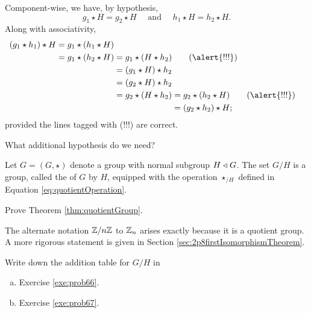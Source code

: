\documentclass[../algebraNotesMSRI-UP2016.tex]{subfiles}
\begin{document}
\begin{frame}
Component-wise, we have, by hypothesis, 
\[
g_1\star H=g_2\star H\quad\text{ and }\quad h_1\star H=h_2\star H.
\]
Along with associativity,
\begin{align*}
(g_1\star h_1)\star H = g_1\star(h_1\star H) \\
	= g_1\star(h_2\star H) &= g_1\star(H\star h_2) \tag{\alert{!!!}}\\
	&= (g_1\star H)\star h_2 \\
	&= (g_2\star H)\star h_2 \\
	&= g_2\star (H\star h_2) = g_2\star (h_2\star H) \tag{\alert{!!!}}\\
	&\phantom{= g_2\star (H\star h_2)} \;=(g_2\star h_2)\star H;
\end{align*}
provided the lines tagged with (\alert{!!!}) are correct.

\smallGap
\begin{que}
What additional hypothesis do we need?
\end{que}
\end{frame}

\begin{frame}[c]
\begin{thm}\label{thm:quotientGroup}
Let $G=(G,\star)$ denote a group with normal subgroup $H\mathrel{\triangleleft} G$.  The set $G/H$ is a group, called the  of $G$ by $H$, equipped with the operation $\star_{/H}$ defined in Equation \eqref{eq:quotientOperation}.
\end{thm}

\smallGap
\begin{UNABexe}\label{exe:quotientGroup}
Prove Theorem \ref{thm:quotientGroup}.
\end{UNABexe}

\smallGap
The alternate notation $\mathbb Z/n\mathbb Z$ to $\mathbb Z_n$ arises exactly because it is a quotient group.  A more rigorous statement is given in Section \ref{sec:2p8firstIsomorphismTheorem}. 
\end{frame}

\begin{frame}[c]
\begin{exe}[cf. Problems 69-70]\label{exe:probs69-70}
Write down the addition table for $G/H$ in 
\begin{enumerate}[(a)]
\item Exercise \ref{exe:prob66}.
\item Exercise \ref{exe:prob67}.
\end{enumerate}
\end{exe}
\end{frame}
\end{document}
